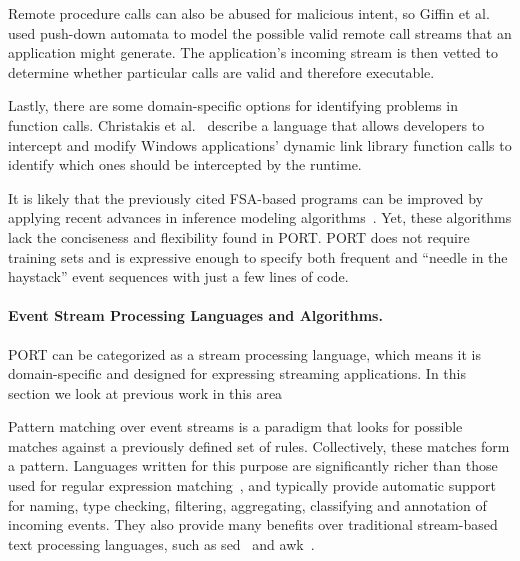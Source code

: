 Remote procedure calls can also be abused for malicious
intent,
so Giffin et al. ~\cite{DBLP:conf/uss/GiffinJM02} used
push-down automata to model the possible valid
remote call streams that an application might generate.
The application's incoming stream 
is then vetted
to determine whether particular calls are valid and therefore executable.

Lastly, there are some domain-specific options for
identifying problems
in function calls.
Christakis et al.~\cite{DBLP:conf/icse/ChristakisEG017} describe a language that allows developers to intercept and modify
Windows applications’ dynamic link library function calls to identify which ones should be
intercepted by the runtime.

%
It is likely that the previously cited FSA-based programs can be improved by applying recent advances in inference modeling algorithms~\cite{MarianiPS17,WalkinshawTD13,EmamM18,BeschastnikhBEK14}. Yet, these algorithms lack the conciseness and flexibility found in PORT. PORT does not require training sets and is expressive enough to specify both frequent and  “needle in the haystack” event sequences with just a few lines of code.


\paragraph{Event Stream Processing Languages and Algorithms.}
PORT can be categorized as a stream processing language,
which means it is domain-specific and
designed for expressing streaming applications.
In this section we look at previous work in this area

Pattern matching
over event streams is a paradigm
that looks for
possible matches against a previously defined set of rules. Collectively, these matches form a pattern.
Languages written for this purpose are significantly richer than those used for regular expression
matching~\cite{DBLP:conf/sigmod/AgrawalDGI08},
and typically provide automatic
support for naming, type checking, filtering, aggregating, classifying and
annotation of incoming events. They also  provide many benefits over traditional
stream-based text processing languages, such as sed~\cite{Mcmahon1979sed} and
awk~\cite{DBLP:journals/spe/AhoKW79}.

